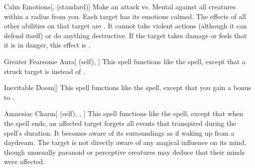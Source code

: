 \lowercase{\hypertarget{spell:Calm Emotions}{}}\label{spell:Calm Emotions}
\begin{freeability}[\nth{3}]{\hypertarget{spell:Calm Emotions}{Calm Emotions}}[,  (standard)]
Make an attack vs. Mental against all creatures within a \arealarge radius from you.
\hit Each target has its emotions calmed.
The effects of all other  abilities on that target are .
It cannot take violent actions (although it can defend itself) or do anything destructive.
If the target takes damage or feels that it is in danger, this effect is .
\end{freeability}
\vspace{0.25em}



\lowercase{\hypertarget{spell:Greater Fearsome Aura}{}}\label{spell:Greater Fearsome Aura}
\begin{attuneability}[\nth{4}]{\hypertarget{spell:Greater Fearsome Aura}{Greater Fearsome Aura}}[ (self), ]
This spell functions like the  spell, except that a struck target is  instead of .
\end{attuneability}
\vspace{0.25em}



\lowercase{\hypertarget{spell:Inevitable Doom}{}}\label{spell:Inevitable Doom}
\begin{freeability}[\nth{4}]{\hypertarget{spell:Inevitable Doom}{Inevitable Doom}}[]
This spell functions like the  spell, except that you gain a  bonus to .
\end{freeability}
\vspace{0.25em}



\lowercase{\hypertarget{spell:Amnesiac Charm}{}}\label{spell:Amnesiac Charm}
\begin{attuneability}[\nth{5}]{\hypertarget{spell:Amnesiac Charm}{Amnesiac Charm}}[ (self), , ]
This spell functions like the  spell, except that when the spell ends, an affected target forgets all events that transpired during the spell's duration.
It becomes aware of its surroundings as if waking up from a daydream.
The target is not directly aware of any magical influence on its mind, though unusually paranoid or perceptive creatures may deduce that their minds were affected.
\end{attuneability}
\vspace{0.25em}



